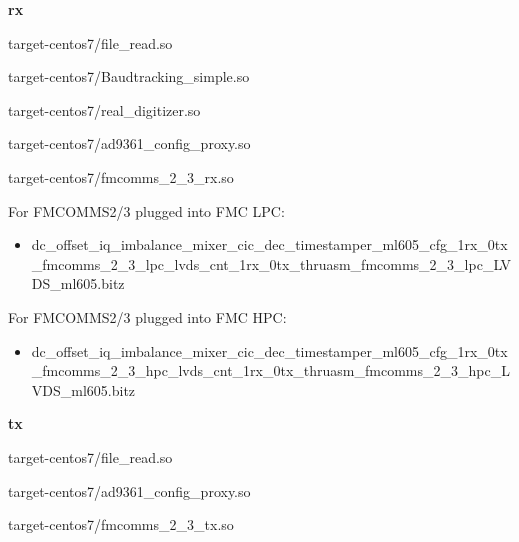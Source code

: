 	\noindent\textbf{rx}
	\begin{itemize}
	\begin{minipage}[t]{.5\textwidth}
	\item target-centos7/file\_read.so
	\item target-centos7/Baudtracking\_simple.so
	\item target-centos7/real\_digitizer.so
	\end{minipage}
	\begin{minipage}[t]{.5\textwidth}
	\item target-centos7/ad9361\_config\_proxy.so
	\item target-centos7/fmcomms\_2\_3\_rx.so
	\end{minipage}
	\end{itemize}
	\noindent For FMCOMMS2/3 plugged into FMC LPC:
	\begin{itemize}
	\item dc\_offset\_iq\_imbalance\_mixer\_cic\_dec\_timestamper\_ml605\_cfg\_1rx\_0tx \\
\_fmcomms\_2\_3\_lpc\_lvds\_cnt\_1rx\_0tx\_thruasm\_fmcomms\_2\_3\_lpc\_LVDS\_ml605.bitz
	\end{itemize}
	\noindent For FMCOMMS2/3 plugged into FMC HPC:
	\begin{itemize}
	\item dc\_offset\_iq\_imbalance\_mixer\_cic\_dec\_timestamper\_ml605\_cfg\_1rx\_0tx \\
\_fmcomms\_2\_3\_hpc\_lvds\_cnt\_1rx\_0tx\_thruasm\_fmcomms\_2\_3\_hpc\_LVDS\_ml605.bitz
	\end{itemize}

	\noindent\textbf{tx}
	\begin{itemize}
	\begin{minipage}[t]{.5\textwidth}
	\item target-centos7/file\_read.so
	\end{minipage}
	\begin{minipage}[t]{.5\textwidth}
	\item target-centos7/ad9361\_config\_proxy.so
	\item target-centos7/fmcomms\_2\_3\_tx.so
	\end{minipage}
	\end{itemize}

